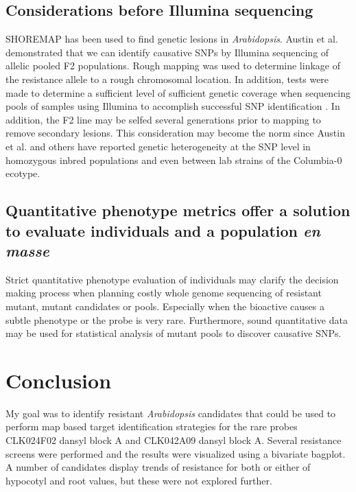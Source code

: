 \subsection{Considerations before Illumina sequencing}

SHOREMAP \cite{ossowski2010rate} has been used to find genetic lesions in {\it Arabidopsis}. Austin et al. \cite{austin2011next} demonstrated that we can identify causative SNPs by Illumina sequencing of allelic pooled F2 populations. Rough mapping was used to determine linkage of the resistance allele to a rough chromosomal location. In addition, tests were made to determine a sufficient level of sufficient genetic coverage when sequencing pools of samples using Illumina to accomplish successful SNP identification \cite{austin2011next}. In addition, the F2 line may be selfed several generations prior to mapping to remove secondary lesions. This consideration may become the norm since Austin et al. and others have reported genetic heterogeneity at the SNP level in homozygous inbred populations and even between lab strains of the Columbia-0 ecotype. 

\subsection{Quantitative phenotype metrics offer a solution to evaluate individuals and a population {\it en masse}}

Strict quantitative phenotype evaluation of individuals may clarify the decision making process when planning costly whole genome sequencing of resistant mutant, mutant candidates or pools. Especially when the bioactive causes a subtle phenotype or the probe is very rare. Furthermore, sound quantitative data may be used for statistical analysis of mutant pools to discover causative SNPs. 


\section{Conclusion}

My goal was to identify resistant {\it Arabidopsis} candidates that could be used to perform map based target identification strategies for the rare probes CLK024F02 dansyl block A and CLK042A09 dansyl block A. Several resistance screens were performed and the results were visualized using a bivariate bagplot. A number of candidates display trends of resistance for both or either of hypocotyl and root values, but these were not explored further. 

